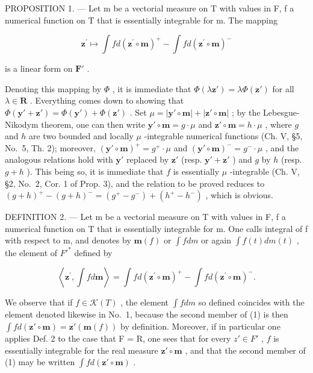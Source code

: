 PROPOSITION 1. --- Let m be a vectorial measure on T with values in F, f a numerical function on T that is essentially integrable for m. The mapping

\[
\mathbf {z} ^ {\prime} \mapsto \int f d (\mathbf {z} ^ {\prime} \circ \mathbf {m}) ^ {+} - \int f d (\mathbf {z} ^ {\prime} \circ \mathbf {m}) ^ {-}
\]

is a linear form on \(\mathbf{F}'\) .

Denoting this mapping by \(\Phi\) , it is immediate that \(\Phi(\lambda\mathbf{z}') = \lambda\Phi(\mathbf{z}')\) for all \(\lambda \in \mathbf{R}\) . Everything comes down to showing that \(\Phi(\mathbf{y}' + \mathbf{z}') = \Phi(\mathbf{y}') + \Phi(\mathbf{z}')\) . Set \(\mu = |\mathbf{y}' \circ \mathbf{m}| + |\mathbf{z}' \circ \mathbf{m}|\) ; by the Lebesgue-Nikodym theorem, one can then write \(\mathbf{y}' \circ \mathbf{m} = g \cdot \mu\) and \(\mathbf{z}' \circ \mathbf{m} = h \cdot \mu\) , where \(g\) and \(h\) are two bounded and locally \(\mu\) -integrable numerical functions (Ch. V, §5, No.~5, Th. 2); moreover, \((\mathbf{y}' \circ \mathbf{m})^+ = g^+ \cdot \mu\) and \((\mathbf{y}' \circ \mathbf{m})^- = g^- \cdot \mu\) , and the analogous relations hold with \(\mathbf{y}'\) replaced by \(\mathbf{z}'\) (resp. \(\mathbf{y}' + \mathbf{z}'\) ) and \(g\) by \(h\) (resp. \(g + h\) ). This being so, it is immediate that \(f\) is essentially \(\mu\) -integrable (Ch. V, §2, No.~2, Cor. 1 of Prop. 3), and the relation to be proved reduces to \((g + h)^+ - (g + h)^- = (g^+ - g^-) + (h^+ - h^-)\) , which is obvious.

DEFINITION 2. --- Let m be a vectorial measure on T with values in F, f a numerical function on T that is essentially integrable for m. One calls integral of f with respect to m, and denotes by \(\mathbf{m}(f)\) or \(\int f dm\) or again \(\int f(t) dm(t)\) , the element of \(F'^{*}\) defined by

\[
\left\langle \mathbf {z} ^ {\prime}, \int f d \mathbf {m} \right\rangle = \int f d (\mathbf {z} ^ {\prime} \circ \mathbf {m}) ^ {+} - \int f d (\mathbf {z} ^ {\prime} \circ \mathbf {m}) ^ {-}.\tag{1}
\]

We observe that if \(f \in \mathcal{K}(T)\) , the element \(\int f dm\) so defined coincides with the element denoted likewise in No.~1, because the second member of (1) is then \(\int f d(\mathbf{z}' \circ \mathbf{m}) = \mathbf{z}'(\mathbf{m}(f))\) by definition. Moreover, if in particular one applies Def. 2 to the case that F = R, one sees that for every \(z' \in F'\) , \(f\) is essentially integrable for the real measure \(\mathbf{z}' \circ \mathbf{m}\) , and that the second member of (1) may be written \(\int f d(\mathbf{z}' \circ \mathbf{m})\) .

